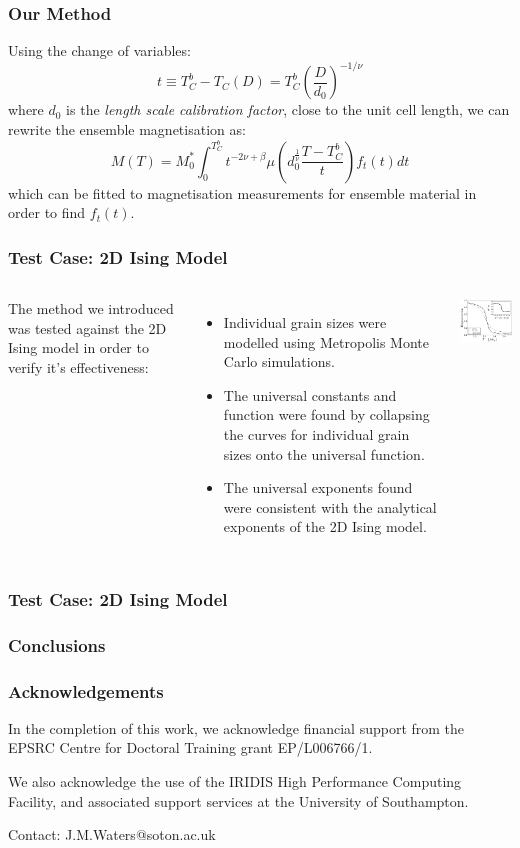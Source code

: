 \documentclass{beamer}
\begin{document}
\begin{frame}
	\frametitle{Our Method}
	Using the change of variables:
	$$
	t \equiv T_C^b - T_C(D) = T_C^b \left(\frac{D}{d_0}\right)^{-1/\nu}
	$$
	where $d_0$ is the \textit{length scale calibration factor}, close to the unit cell length, we can rewrite the ensemble magnetisation as:
	$$
	M(T) = M_0^*\int_0^{T_C^b} t^{-2\nu +\beta} \mu\left(d_0^{\frac{1}{\nu}}\frac{T-T_C^b}{t}\right) f_t(t) dt
	$$
	which can be fitted to magnetisation measurements for ensemble material in order to find $f_t(t)$.
\end{frame}

\begin{frame}
	\frametitle{Test Case: 2D Ising Model}
	\begin{columns}
	\column{7cm}
		The method we introduced was tested against the 2D Ising model in order to verify it's effectiveness:
		\begin{itemize}
		\item{Individual grain sizes were modelled using Metropolis Monte Carlo simulations.}
		\item{The universal constants and function were found by collapsing the curves for individual grain sizes onto the universal function.}
		\item{The universal exponents found were consistent with the analytical exponents of the 2D Ising model.}
		\end{itemize}
	\column{5cm}
		\includegraphics[width=5cm]{Images/Ds}
	\end{columns}
\end{frame}

\begin{frame}
	\frametitle{Test Case: 2D Ising Model}
\end{frame}

\begin{frame}
	\frametitle{Conclusions}
\end{frame}

\begin{frame}
	\frametitle{Acknowledgements}
	In the completion of this work, we acknowledge financial support from the EPSRC Centre for Doctoral Training grant EP/L006766/1. \newline
	
	We also acknowledge the use of the IRIDIS High Performance Computing Facility, and associated support services at the University of
Southampton. \newline

	Contact: J.M.Waters@soton.ac.uk
\end{frame}
\end{document}
